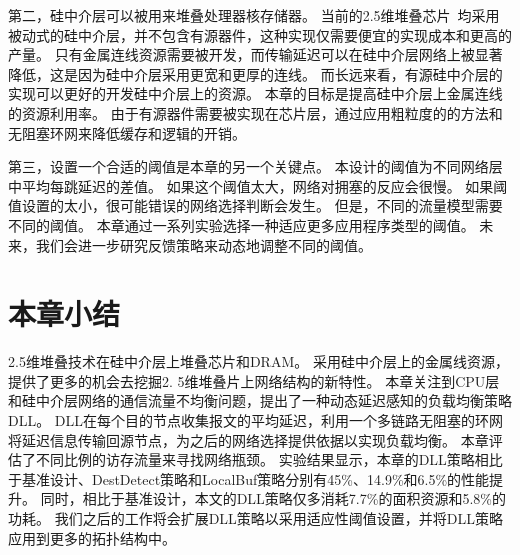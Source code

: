 第二，硅中介层可以被用来堆叠处理器核存储器。
当前的2.5维堆叠芯片~均采用被动式的硅中介层，并不包含有源器件，这种实现仅需要便宜的实现成本和更高的产量。
只有金属连线资源需要被开发，而传输延迟可以在硅中介层网络上被显著降低，这是因为硅中介层采用更宽和更厚的连线。
而长远来看，有源硅中介层的实现可以更好的开发硅中介层上的资源。
本章的目标是提高硅中介层上金属连线的资源利用率。
由于有源器件需要被实现在芯片层，通过应用粗粒度的的方法和无阻塞环网来降低缓存和逻辑的开销。

第三，设置一个合适的阈值是本章的另一个关键点。
本设计的阈值为不同网络层中平均每跳延迟的差值。
如果这个阈值太大，网络对拥塞的反应会很慢。
如果阈值设置的太小，很可能错误的网络选择判断会发生。
但是，不同的流量模型需要不同的阈值。
本章通过一系列实验选择一种适应更多应用程序类型的阈值。
未来，我们会进一步研究反馈策略来动态地调整不同的阈值。



\section{本章小结}
\label{sec:dllconclusion}
2.5维堆叠技术在硅中介层上堆叠芯片和DRAM。
采用硅中介层上的金属线资源，提供了更多的机会去挖掘2. 5维堆叠片上网络结构的新特性。
本章关注到CPU层和硅中介层网络的通信流量不均衡问题，提出了一种动态延迟感知的负载均衡策略DLL。
DLL在每个目的节点收集报文的平均延迟，利用一个多链路无阻塞的环网将延迟信息传输回源节点，为之后的网络选择提供依据以实现负载均衡。
本章评估了不同比例的访存流量来寻找网络瓶颈。
实验结果显示，本章的DLL策略相比于基准设计、DestDetect策略和LocalBuf策略分别有45\%、14.9\%和6.5\%的性能提升。
同时，相比于基准设计，本文的DLL策略仅多消耗7.7\%的面积资源和5.8\%的功耗。
我们之后的工作将会扩展DLL策略以采用适应性阈值设置，并将DLL策略应用到更多的拓扑结构中。